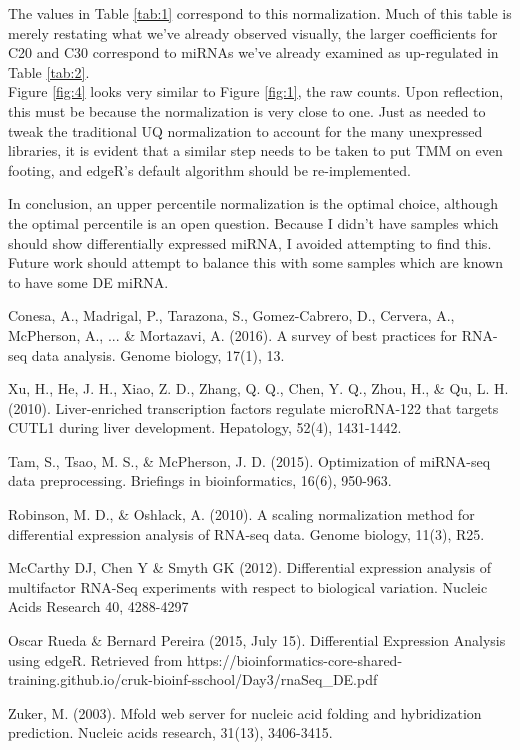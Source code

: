 \documentclass{bioinfo}
\begin{document}
The values in Table \ref{tab:1} correspond to this normalization. Much of this table is merely restating what we've already observed visually, the larger coefficients for C20 and C30 correspond to miRNAs we've already examined as up-regulated in Table \ref{tab:2}. \vspace{4pt} \\
Figure \ref{fig:4} looks very similar to Figure \ref{fig:1}, the raw counts. Upon reflection, this must be because the normalization is very close to one. Just as \citep{Tam15} needed to tweak the traditional UQ normalization to account for the many unexpressed libraries, it is evident that a similar step needs to be taken to put TMM on even footing, and edgeR's default algorithm should be re-implemented. 

In conclusion, an upper percentile normalization is the optimal choice, although the optimal percentile is an open question.
Because I didn't have samples which should show differentially expressed miRNA, I avoided attempting to find this. Future work should attempt to balance this with some samples which are known to have some DE miRNA. 

\begin{thebibliography}{}

Conesa, A., Madrigal, P., Tarazona, S., Gomez-Cabrero, D., Cervera, A., McPherson, A., ... \& Mortazavi, A. (2016). A survey of best practices for RNA-seq data analysis. Genome biology, 17(1), 13.

Xu, H., He, J. H., Xiao, Z. D., Zhang, Q. Q., Chen, Y. Q., Zhou, H., \& Qu, L. H. (2010). Liver-enriched transcription factors regulate microRNA-122 that targets CUTL1 during liver development. Hepatology, 52(4), 1431-1442.

 Tam, S., Tsao, M. S., \& McPherson, J. D. (2015). Optimization of miRNA-seq data preprocessing. Briefings in bioinformatics, 16(6), 950-963.

Robinson, M. D., \& Oshlack, A. (2010). A scaling normalization method for differential expression analysis of RNA-seq data. Genome biology, 11(3), R25.

McCarthy DJ, Chen Y \& Smyth GK (2012). Differential expression analysis of multifactor RNA-Seq experiments with respect to biological variation. Nucleic Acids Research 40, 4288-4297

Oscar Rueda \& Bernard Pereira (2015, July 15). Differential Expression Analysis using edgeR. Retrieved from https://bioinformatics-core-shared-training.github.io/cruk-bioinf-sschool/Day3/rnaSeq\_DE.pdf

Zuker, M. (2003). Mfold web server for nucleic acid folding and hybridization prediction. Nucleic acids research, 31(13), 3406-3415.


\end{thebibliography}
\end{document}

